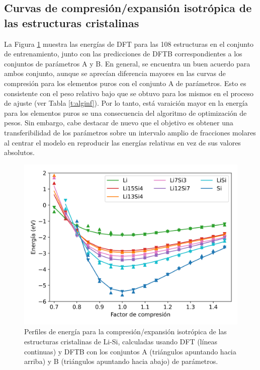 \subsection{Curvas de compresión/expansión isotrópica de las estructuras cristalinas}

La Figura \ref{fig:compresion} muestra las energías de DFT para las 108 
estructuras en el conjunto de entrenamiento, junto con las predicciones de
DFTB correspondientes a los conjuntos de parámetros A y B. En general, se 
encuentra un buen acuerdo para ambos conjunto, aunque se aprecían diferencia
mayores en las curvas de compresión para los elementos puros con el conjunto 
A de parámetros. Esto es consistente con el peso relativo bajo que se obtuvo
para los mismos en el proceso de ajuste (ver Tabla \ref{t:alginf}). Por lo 
tanto, está varaición mayor en la energía para los elementos puros se una 
consecuencia del algoritmo de optimización de pesos. Sin embargo, cabe 
destacar de nuevo que el objetivo es obtener una transferibilidad de los 
parámetros sobre un intervalo amplio de fracciones molares al centrar el 
modelo en reproducir las energías relativas en vez de sus valores absolutos.

\begin{figure}[th]
    \centering
    \includegraphics[width=.7\textwidth]{Silicio/modelo/resultados/compresion/compresion.png}
    \caption{Perfiles de energía para la compresión/expansión isotrópica de las 
    estructuras cristalinas de Li-Si, calculadas usando DFT (líneas continuas) 
    y DFTB con los conjuntos A (triángulos apuntando hacia arriba) y B 
    (triángulos apuntando hacia abajo) de parámetros.}
    \label{fig:compresion}
\end{figure}
